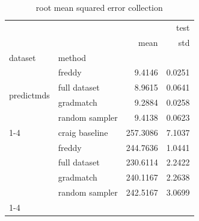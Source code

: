\begin{table}\label{tab:rmse}
\caption{root mean squared error collection}
\centering
\begin{tabular}{llrr}
\toprule
 &  & \multicolumn{2}{r}{test} \\
 &  & mean & std \\
dataset & method &  &  \\
\midrule
\multirow[t]{4}{*}{predictmds} & freddy & 9.4146 & 0.0251 \\
 & full dataset & 8.9615 & 0.0641 \\
 & gradmatch & 9.2884 & 0.0258 \\
 & random sampler & 9.4138 & 0.0623 \\
\cline{1-4}
\multirow[t]{5}{*}{sgemm} & craig baseline & 257.3086 & 7.1037 \\
 & freddy & 244.7636 & 1.0441 \\
 & full dataset & 230.6114 & 2.2422 \\
 & gradmatch & 240.1167 & 2.2638 \\
 & random sampler & 242.5167 & 3.0699 \\
\cline{1-4}
\bottomrule
\end{tabular}
\end{table}
